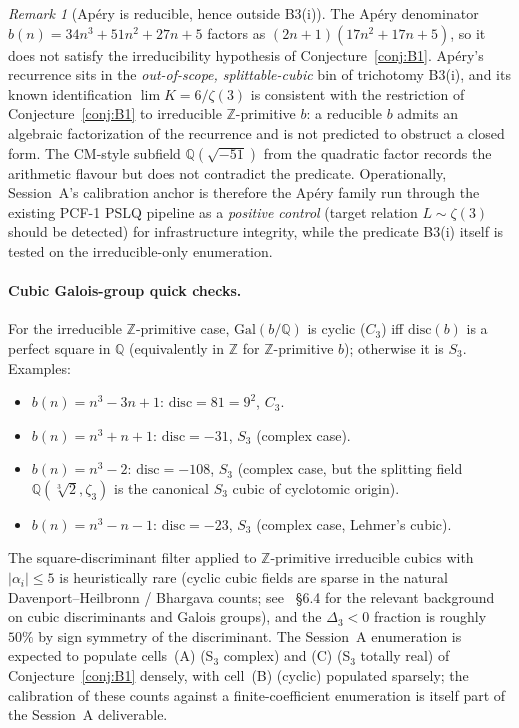 \documentclass[11pt,a4paper]{article}
\theoremstyle{definition}
\theoremstyle{remark}
\newtheorem{remark}[conjecture]{Remark}
\newcommand{\Q}{\mathbb{Q}}
\newcommand{\Z}{\mathbb{Z}}
\newcommand{\disc}{\mathrm{disc}}
\newcommand{\Gal}{\mathrm{Gal}}
\begin{document}
\begin{remark}[Ap\'ery is reducible, hence outside
B3(i)]\label{rem:apery-reducible}
The Ap\'ery denominator $b(n)=34n^{3}+51n^{2}+27n+5$ factors as
$(2n+1)(17n^{2}+17n+5)$, so it does not satisfy the irreducibility
hypothesis of Conjecture~\ref{conj:B1}. Ap\'ery's recurrence sits in
the \emph{out-of-scope, splittable-cubic} bin of trichotomy B3(i), and
its known identification $\lim K = 6/\zeta(3)$
\cite{vanderPoorten1979,Apery1979,Beukers1979} is consistent with the
restriction of Conjecture~\ref{conj:B1} to irreducible $\Z$-primitive
$b$: a reducible $b$ admits an algebraic factorization of the
recurrence and is not predicted to obstruct a closed form. The CM-style
subfield $\Q(\sqrt{-51})$ from the quadratic factor records the
arithmetic flavour but does not contradict the predicate. Operationally,
Session~A's calibration anchor is therefore the Ap\'ery family run
through the existing PCF-1 PSLQ pipeline as a \emph{positive control}
(target relation $L\sim\zeta(3)$ should be detected) for infrastructure
integrity, while the predicate B3(i) itself is tested on the
irreducible-only enumeration.
\end{remark}

\paragraph{Cubic Galois-group quick checks.}
For the irreducible $\Z$-primitive case, $\Gal(b/\Q)$ is cyclic ($C_{3}$)
iff $\disc(b)$ is a perfect square in $\Q$ (equivalently in $\Z$ for
$\Z$-primitive $b$); otherwise it is $S_{3}$. Examples:
\begin{itemize}[leftmargin=*]
\item $b(n)=n^{3}-3n+1$: $\disc=81=9^{2}$, $C_{3}$.
\item $b(n)=n^{3}+n+1$: $\disc=-31$, $S_{3}$ (complex case).
\item $b(n)=n^{3}-2$: $\disc=-108$, $S_{3}$ (complex case, but the
splitting field $\Q(\sqrt[3]{2},\zeta_{3})$ is the canonical $S_{3}$
cubic of cyclotomic origin).
\item $b(n)=n^{3}-n-1$: $\disc=-23$, $S_{3}$ (complex case, Lehmer's cubic).
\end{itemize}
The square-discriminant filter applied to $\Z$-primitive irreducible
cubics with $|\alpha_{i}|\le 5$ is heuristically rare (cyclic cubic
fields are sparse in the natural Davenport--Heilbronn / Bhargava
counts; see~\cite{Cohen2007} \S6.4 for the relevant background on
cubic discriminants and Galois groups), and the $\Delta_{3}<0$ fraction
is roughly $50\%$ by sign symmetry of the discriminant. The Session~A
enumeration is expected to populate cells~(A) (S$_{3}$ complex) and
(C) (S$_{3}$ totally real) of Conjecture~\ref{conj:B1} densely, with
cell~(B) (cyclic) populated sparsely; the calibration of these counts
against a finite-coefficient enumeration is itself part of the
Session~A deliverable.
\end{document}
